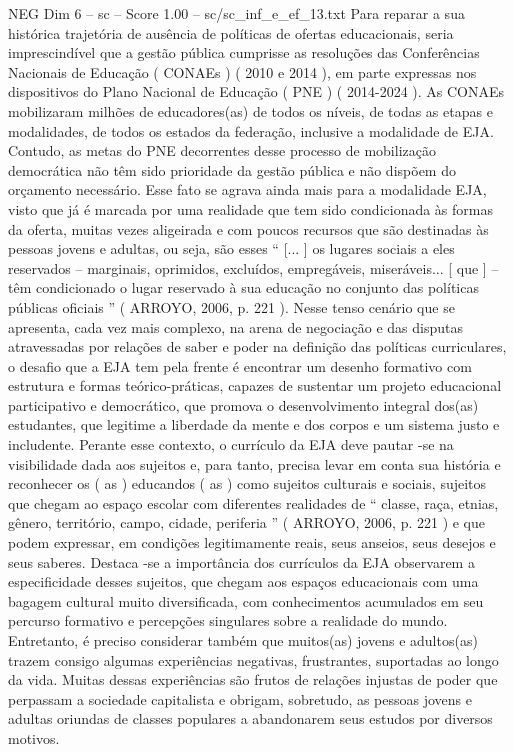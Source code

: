 \begin{textsample}{NEG Dim 6 – sc – Score 1.00 – sc/sc\_inf\_e\_ef\_13.txt}
Para reparar a sua histórica trajetória de ausência de políticas de ofertas educacionais, seria imprescindível que a gestão pública cumprisse as resoluções das Conferências Nacionais de Educação ( CONAEs ) ( 2010 e 2014 ), em parte expressas nos dispositivos do Plano Nacional de Educação ( PNE ) ( 2014-2024 ).
As CONAEs mobilizaram milhões de educadores(as) de todos os níveis, de todas as etapas e modalidades, de todos os estados da federação, inclusive a modalidade de EJA.
Contudo, as metas do PNE decorrentes desse processo de mobilização democrática não têm sido prioridade da gestão pública e não dispõem do orçamento necessário.
Esse fato se agrava ainda mais para a modalidade EJA, visto que já é marcada por uma realidade que tem sido condicionada às formas da oferta, muitas vezes aligeirada e com poucos recursos que são destinadas às pessoas jovens e adultas, ou seja, são esses “ [... ] os lugares sociais a eles reservados – marginais, oprimidos, excluídos, empregáveis, miseráveis... [ que ] – têm condicionado o lugar reservado à sua educação no conjunto das políticas públicas oficiais ” ( ARROYO, 2006, p. 221 ).
Nesse tenso cenário que se apresenta, cada vez mais complexo, na arena de negociação e das disputas atravessadas por relações de saber e poder na definição das políticas curriculares, o desafio que a EJA tem pela frente é encontrar um desenho formativo com estrutura e formas teórico-práticas, capazes de sustentar um projeto educacional participativo e democrático, que promova o desenvolvimento integral dos(as) estudantes, que legitime a liberdade da mente e dos corpos e um sistema justo e includente.
Perante esse contexto, o currículo da EJA deve pautar -se na visibilidade dada aos sujeitos e, para tanto, precisa levar em conta sua história e reconhecer os ( as ) educandos ( as ) como sujeitos culturais e sociais, sujeitos que chegam ao espaço escolar com diferentes realidades de “ classe, raça, etnias, gênero, território, campo, cidade, periferia ” ( ARROYO, 2006, p. 221 ) e que podem expressar, em condições legitimamente reais, seus anseios, seus desejos e seus saberes.
Destaca -se a importância dos currículos da EJA observarem a especificidade desses sujeitos, que chegam aos espaços educacionais com uma bagagem cultural muito diversificada, com conhecimentos acumulados em seu percurso formativo e percepções singulares sobre a realidade do mundo.
Entretanto, é preciso considerar também que muitos(as) jovens e adultos(as) trazem consigo algumas experiências negativas, frustrantes, suportadas ao longo da vida.
Muitas dessas experiências são frutos de relações injustas de poder que perpassam a sociedade capitalista e obrigam, sobretudo, as pessoas jovens e adultas oriundas de classes populares a abandonarem seus estudos por diversos motivos.

\end{textsample}
